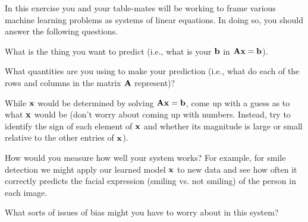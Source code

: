 \begin{prob}
In this exercise you and your table-mates will be working to frame various machine learning problems as systems of linear equations.  In doing so, you should answer the following questions.
\bi
\item What is the thing you want to predict (i.e., what is your $\mathbf{b}$ in $\mathbf{A} \mathbf{x} = \mathbf{b}$).
\item What quantities are you using to make your prediction (i.e., what do each of the rows and columns in the matrix $\mathbf{A}$ represent)?
\item While $\mathbf{x}$ would be determined by solving $\mathbf{A} \mathbf{x} = \mathbf{b}$, come up with a guess as to what $\mathbf{x}$ would be (don't worry about coming up with numbers.  Instead, try to identify the sign of each element of $\mathbf{x}$ and  whether its magnitude is large or small relative to the other entries of $\mathbf{x}$).
\item How would you measure how well your system works?  For example, for smile detection we might apply our learned model $\mathbf{x}$ to new data and see how often it correctly predicts the facial expression (smiling vs. not smiling) of the person in each image.
\item What sorts of issues of bias might you have to worry about in this system?
\ei


\end{prob}
